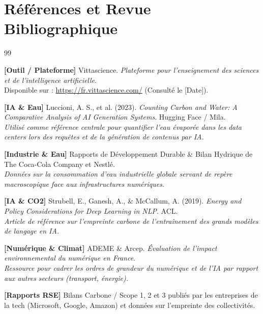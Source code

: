 \documentclass[11pt, a4paper]{article}
\begin{document}
\section*{Références et Revue Bibliographique}
\begin{thebibliography}{99}

\textbf{[Outil / Plateforme]} Vittascience. \textit{Plateforme pour l'enseignement des sciences et de l'intelligence artificielle}. \\
Disponible sur : \url{https://fr.vittascience.com/} (Consulté le [Date]).

\textbf{[IA \& Eau]} Luccioni, A. S., et al. (2023). \textit{Counting Carbon and Water: A Comparative Analysis of AI Generation Systems}. Hugging Face / Mila. \\
\textit{Utilisé comme référence centrale pour quantifier l'eau évaporée dans les data centers lors des requêtes et de la génération de contenus par IA.}

\textbf{[Industrie \& Eau]} Rapports de Développement Durable \& Bilan Hydrique de The Coca-Cola Company et Nestlé. \\
\textit{Données sur la consommation d'eau industrielle globale servant de repère macroscopique face aux infrastructures numériques.}

\textbf{[IA \& CO2]} Strubell, E., Ganesh, A., \& McCallum, A. (2019). \textit{Energy and Policy Considerations for Deep Learning in NLP}. ACL. \\
\textit{Article de référence sur l'empreinte carbone de l'entraînement des grands modèles de langage en IA.}

\textbf{[Numérique \& Climat]} ADEME \& Arcep. \textit{Évaluation de l'impact environnemental du numérique en France}. \\
\textit{Ressource pour cadrer les ordres de grandeur du numérique et de l'IA par rapport aux autres secteurs (transport, énergie).}

\textbf{[Rapports RSE]} Bilans Carbone / Scope 1, 2 et 3 publiés par les entreprises de la tech (Microsoft, Google, Amazon) et données sur l'empreinte des collectivités.

\end{thebibliography}
\end{document}
